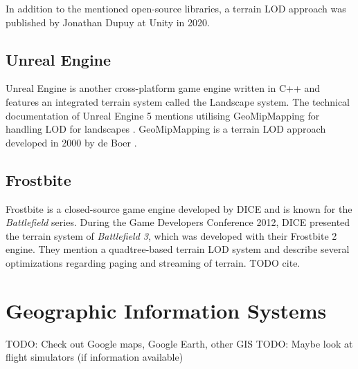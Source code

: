 In addition to the mentioned open-source libraries, a terrain LOD approach was published by Jonathan Dupuy at Unity in 2020.

\subsection{Unreal Engine}
Unreal Engine is another cross-platform game engine written in C++ and features
an integrated terrain system called the Landscape system.
The technical documentation of Unreal Engine 5 mentions utilising GeoMipMapping for 
handling LOD for landscapes \cite{unrealengine5doc}. GeoMipMapping is a terrain LOD approach developed 
in 2000 by de Boer \cite{geomipmapping}. %

\subsection{Frostbite}
Frostbite is a closed-source game engine developed by DICE and is known for the \textit{Battlefield} series.
During the Game Developers Conference 2012, DICE presented the terrain system of \textit{Battlefield 3}, which was developed with their Frostbite 2 engine.
They mention a quadtree-based terrain LOD system and describe several optimizations regarding paging and streaming of terrain.
TODO cite.

\section{Geographic Information Systems}
TODO: Check out Google maps, Google Earth, other GIS
TODO: Maybe look at flight simulators (if information available)
